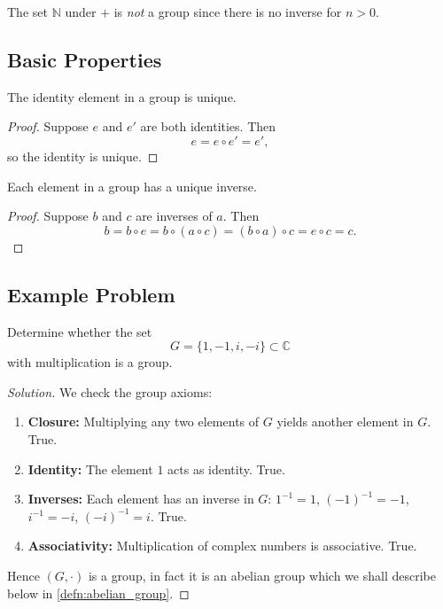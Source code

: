 \begin{ex}
The set $\mathbb{N}$ under $+$ is \emph{not} a group since
there is no inverse for $n > 0$.
\end{ex}

\subsection{Basic Properties}

\begin{thm}
\label{thm:identity-unique}
The identity element in a group is unique.
\end{thm}

\begin{proof}
Suppose $e$ and $e'$ are both identities. Then
$$
e = e \circ e' = e',
$$
so the identity is unique.
\end{proof}

\begin{thm}
\label{thm:inverse-unique}
Each element in a group has a unique inverse.
\end{thm}

\begin{proof}
Suppose $b$ and $c$ are inverses of $a$. Then
$$
b = b \circ e = b \circ (a \circ c) = (b \circ a) \circ c = e \circ c = c.
$$
\end{proof}

\subsection{Example Problem}

\begin{prob}
Determine whether the set 
$$
G = \{1, -1, i, -i\} \subset \mathbb{C}
$$ 
with multiplication is a group.
\end{prob}

\begin{proof}[Solution]
We check the group axioms:
\begin{enumerate}
    \item \textbf{Closure:} Multiplying any two elements of $G$ yields another element in $G$. True.
    \item \textbf{Identity:} The element $1$ acts as identity. True.
    \item \textbf{Inverses:} Each element has an inverse in $G$: $1^{-1}=1$, $(-1)^{-1}=-1$, $i^{-1}=-i$, $(-i)^{-1}=i$. True.
    \item \textbf{Associativity:} Multiplication of complex numbers is associative. True.
\end{enumerate}
Hence $(G, \cdot)$ is a group, in fact it is an abelian group 
which we shall describe below in \cref{defn:abelian_group}. 
\end{proof}


